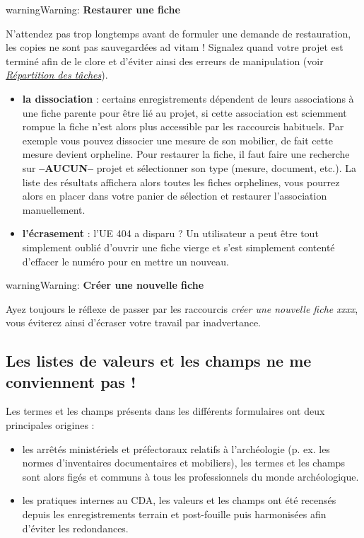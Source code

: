 \documentclass[letterpaper,10pt,french]{sphinxmanual}
\begin{document}
\begin{notice}{warning}{Warning:}
\textbf{Restaurer une fiche}

N'attendez pas trop longtemps avant de formuler une demande de restauration, les copies ne sont pas sauvegardées ad vitam !
Signalez quand votre projet est terminé afin de le clore et d'éviter ainsi des erreurs de manipulation (voir {\hyperref[manuel/formulaire_projet:projet-taches]{\emph{Répartition des tâches}}}).
\end{notice}
\begin{itemize}
\item {} 
\textbf{la dissociation} : certains enregistrements dépendent de leurs associations à une fiche parente pour être lié au projet, si cette association est sciemment rompue la fiche n'est alors plus accessible par les raccourcis habituels. Par exemple vous pouvez dissocier une mesure de son mobilier, de fait cette mesure devient orpheline. Pour restaurer la fiche, il faut faire une recherche sur \textbf{--AUCUN--} projet et sélectionner son type (mesure, document, etc.). La liste des résultats affichera alors toutes les fiches orphelines, vous pourrez alors en placer dans votre panier de sélection et restaurer l'association manuellement.

\item {} 
\textbf{l'écrasement} : l'UE 404 a disparu ? Un utilisateur a peut être tout simplement oublié d'ouvrir une fiche vierge et s'est simplement contenté d'effacer le numéro pour en mettre un nouveau.

\end{itemize}

\begin{notice}{warning}{Warning:}
\textbf{Créer une nouvelle fiche}

Ayez toujours le réflexe de passer par les raccourcis \emph{créer une nouvelle fiche xxxx}, vous éviterez ainsi d'écraser votre travail par inadvertance.
\end{notice}


\subsection{Les listes de valeurs et les champs ne me conviennent pas !}
\label{manuel/questions_frequentes:def-valeurs-manquantes}\label{manuel/questions_frequentes:les-listes-de-valeurs-et-les-champs-ne-me-conviennent-pas}
Les termes et les champs présents dans les différents formulaires ont deux principales origines :
\begin{itemize}
\item {} 
les arrêtés ministériels et préfectoraux relatifs à l'archéologie (p. ex. les normes d’inventaires documentaires et mobiliers), les termes et les champs sont alors figés et communs à tous les professionnels du monde archéologique.

\item {} 
les pratiques internes au CDA, les valeurs et les champs ont été recensés depuis les enregistrements terrain et post-fouille puis harmonisées afin d’éviter les redondances.

\end{itemize}
\end{document}

